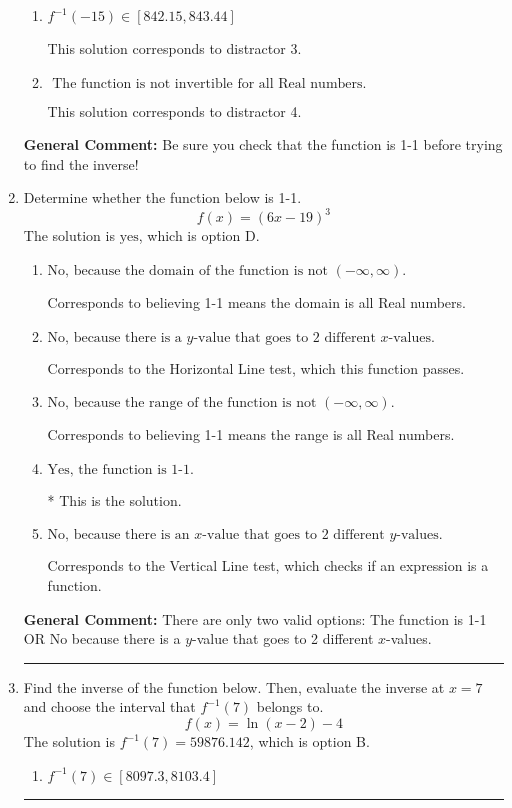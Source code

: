 \documentclass{extbook}[14pt]
\newcommand{\litem}[1]{\item #1

\rule{\textwidth}{0.4pt}}
\begin{document}
\begin{enumerate}
{\begin{enumerate}[label=\Alph*.]
 This solution corresponds to distractor 2.
\item \( f^{-1}(-15) \in [842.15, 843.44] \)

 This solution corresponds to distractor 3.
\item \( \text{ The function is not invertible for all Real numbers. } \)

 This solution corresponds to distractor 4.
\end{enumerate}

\textbf{General Comment:} Be sure you check that the function is 1-1 before trying to find the inverse!
}
\litem{
Determine whether the function below is 1-1.
\[ f(x) = (6 x - 19)^3 \]The solution is \( \text{yes} \), which is option D.\begin{enumerate}[label=\Alph*.]
\item \( \text{No, because the domain of the function is not $(-\infty, \infty)$.} \)

Corresponds to believing 1-1 means the domain is all Real numbers.
\item \( \text{No, because there is a $y$-value that goes to 2 different $x$-values.} \)

Corresponds to the Horizontal Line test, which this function passes.
\item \( \text{No, because the range of the function is not $(-\infty, \infty)$.} \)

Corresponds to believing 1-1 means the range is all Real numbers.
\item \( \text{Yes, the function is 1-1.} \)

* This is the solution.
\item \( \text{No, because there is an $x$-value that goes to 2 different $y$-values.} \)

Corresponds to the Vertical Line test, which checks if an expression is a function.
\end{enumerate}

\textbf{General Comment:} There are only two valid options: The function is 1-1 OR No because there is a $y$-value that goes to 2 different $x$-values.
}
\litem{
Find the inverse of the function below. Then, evaluate the inverse at $x = 7$ and choose the interval that $f^{-1}(7)$ belongs to.
\[ f(x) = \ln{(x-2)}-4 \]The solution is \( f^{-1}(7) = 59876.142 \), which is option B.\begin{enumerate}[label=\Alph*.]
\item \( f^{-1}(7) \in [8097.3, 8103.4] \)


\end{enumerate}}
\end{enumerate}
\end{document}

